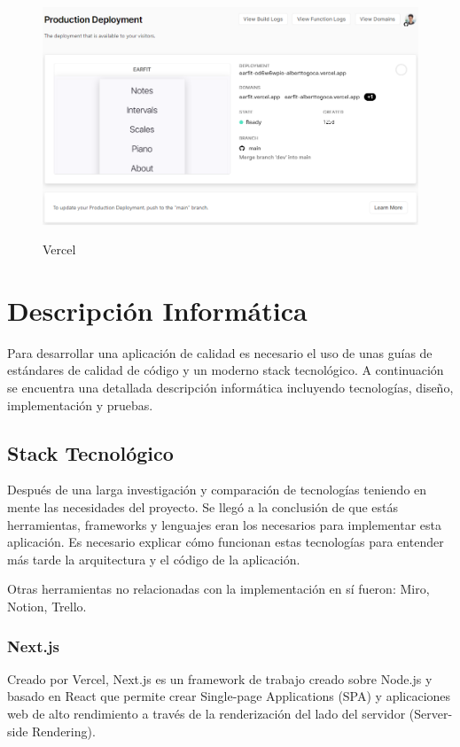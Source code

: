 \documentclass[12pt,twoside,titlepage]{report}
\begin{document}
\begin{figure}[H]
    \centering
    \includegraphics[scale=0.54]{DevOps/Vercel}
    \label{fig:Vercel}
    \caption{Vercel}
\end{figure}

\chapter{Descripción Informática}

Para desarrollar una aplicación de calidad es necesario el uso de unas guías de estándares de calidad de código y un moderno stack tecnológico. A continuación se encuentra una detallada descripción informática incluyendo tecnologías, diseño, implementación y pruebas.

\section{Stack Tecnológico}

Después de una larga investigación y comparación de tecnologías teniendo en mente las necesidades del proyecto. Se llegó a la conclusión de que estás herramientas, frameworks y lenguajes eran los necesarios para implementar esta aplicación. Es necesario explicar cómo funcionan estas tecnologías para entender más tarde la arquitectura y el código de la aplicación.

Otras herramientas no relacionadas con la implementación en sí fueron: Miro, Notion, Trello.

\subsection{Next.js}

Creado por Vercel, Next.js es un framework de trabajo creado sobre Node.js y basado en React que permite crear Single-page Applications (SPA) y aplicaciones web de alto rendimiento a través de la renderización del lado del servidor (Server-side Rendering).
\end{document}
